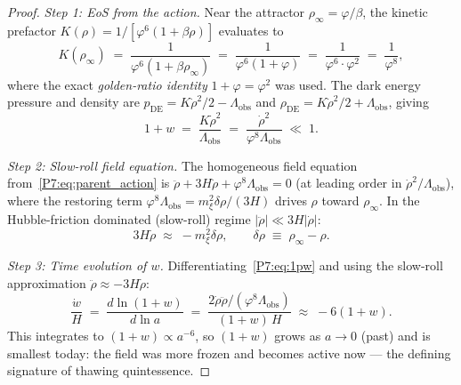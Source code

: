 \documentclass[11pt,a4paper]{article}
\theoremstyle{definition}
\theoremstyle{remark}
\newcommand{\vp}{\varphi}
\newcommand{\Lobs}{\Lambda_{\mathrm{obs}}}
\newcommand{\rinfty}{\rho_{\infty}}
\begin{document}
\begin{proof}
\emph{Step 1: EoS from the action.}
Near the attractor $\rinfty=\vp/\beta$, the kinetic prefactor
$K(\rho)=1/[\vp^6(1+\beta\rho)]$ evaluates to
\begin{equation}
  K(\rinfty)
  \;=\; \frac{1}{\vp^6(1+\beta\rinfty)}
  \;=\; \frac{1}{\vp^6(1+\vp)}
  \;=\; \frac{1}{\vp^6\cdot\vp^2}
  \;=\; \frac{1}{\vp^8},
  \label{P7:eq:K_attractor}
\end{equation}
where the exact \emph{golden-ratio identity} $1+\vp=\vp^2$ was used.
The dark energy pressure and density are
$p_{\mathrm{DE}}=K\dot\rho^2/2-\Lobs$ and
$\rho_{\mathrm{DE}}=K\dot\rho^2/2+\Lobs$, giving
\begin{equation}
  1+w \;=\; \frac{K\dot\rho^2}{\Lobs}
           \;=\; \frac{\dot\rho^2}{\vp^8\Lobs}
           \;\ll\; 1.
  \label{P7:eq:1pw}
\end{equation}

\emph{Step 2: Slow-roll field equation.}
The homogeneous field equation from~\eqref{P7:eq:parent_action} is
$\ddot\rho + 3H\dot\rho + \vp^8\Lobs = 0$ (at leading order in $\dot\rho^2/\Lobs$),
where the restoring term $\vp^8\Lobs = m_\xi^2\delta\rho / (3H)$
drives $\rho$ toward $\rinfty$.
In the Hubble-friction dominated (slow-roll) regime $|\ddot\rho|\ll3H|\dot\rho|$:
\begin{equation}
  3H\dot\rho \;\approx\; -m_\xi^2\delta\rho, \qquad
  \delta\rho\;\equiv\;\rinfty-\rho.
  \label{P7:eq:slow_roll}
\end{equation}

\emph{Step 3: Time evolution of $w$.}
Differentiating~\eqref{P7:eq:1pw} and using the slow-roll
approximation $\ddot\rho\approx-3H\dot\rho$:
\begin{equation}
  \frac{\dot w}{H}
  \;=\; \frac{d\ln(1+w)}{d\ln a}
  \;=\; \frac{2\dot\rho\ddot\rho/(\vp^8\Lobs)}{(1+w)\,H}
  \;\approx\; -6(1+w).
  \label{P7:eq:dwda}
\end{equation}
This integrates to $(1+w)\propto a^{-6}$, so $(1+w)$ grows as $a\to0$ (past)
and is smallest today: the field was more frozen and becomes active now
--- the defining signature of thawing quintessence.


\end{proof}
\end{document}
